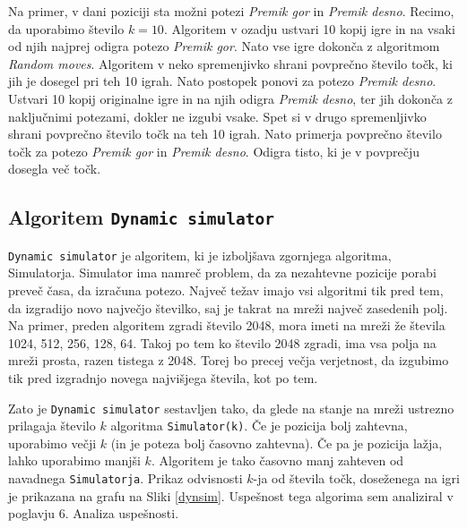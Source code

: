 \documentclass{article}
\begin{document}
Na primer, v dani poziciji sta možni potezi \emph{Premik gor} in \emph{Premik desno}. Recimo, da uporabimo število $k=10$. Algoritem v ozadju ustvari 10 kopij igre in na vsaki od njih najprej odigra potezo \emph{Premik gor}. Nato vse igre dokonča z algoritmom \emph{Random moves}. Algoritem v neko spremenjivko shrani povprečno število točk, ki jih je dosegel pri teh 10 igrah. Nato postopek ponovi za potezo \emph{Premik desno}. Ustvari 10 kopij originalne igre in na njih odigra \emph{Premik desno}, ter jih dokonča z naključnimi potezami, dokler ne izgubi vsake. Spet si v drugo spremenljivko shrani povprečno število točk na teh 10 igrah. Nato primerja povprečno število točk za potezo \emph{Premik gor} in \emph{Premik desno}. Odigra tisto, ki je v povprečju dosegla več točk.

\subsection{Algoritem \texttt{Dynamic simulator}}

\texttt{Dynamic simulator} je algoritem, ki je izboljšava zgornjega algoritma, Simulatorja. Simulator ima namreč problem, da za nezahtevne pozicije porabi preveč časa, da izračuna potezo. Največ težav imajo vsi algoritmi tik pred tem, da izgradijo novo največjo številko, saj je takrat na mreži največ zasedenih polj. Na primer, preden algoritem zgradi število 2048, mora imeti na mreži že števila 1024, 512, 256, 128, 64. Takoj po tem ko število 2048 zgradi, ima vsa polja na mreži prosta, razen tistega z 2048. Torej bo precej večja verjetnost, da izgubimo tik pred izgradnjo novega najvišjega števila, kot po tem. 

Zato je \texttt{Dynamic simulator} sestavljen tako, da glede na stanje na mreži ustrezno prilagaja število $k$ algoritma \texttt{Simulator(k)}. Če je pozicija bolj zahtevna, uporabimo večji $k$ (in je poteza bolj časovno zahtevna). Če pa je pozicija lažja, lahko uporabimo manjši $k$. Algoritem je tako časovno manj zahteven od navadnega \texttt{Simulatorja}. Prikaz odvisnosti $k$-ja od števila točk, doseženega na igri je prikazana na grafu na Sliki \ref{dynsim}. Uspešnost tega algorima sem analiziral v poglavju 6. Analiza uspešnosti.
\end{document}
